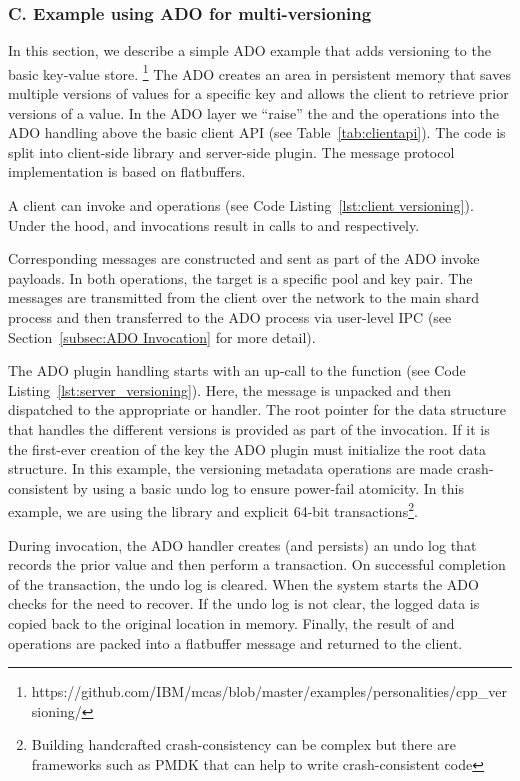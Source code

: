 \newpage
\subsubsection*{C. Example using ADO for multi-versioning}
\label{appendix:ado_versioning}
In this section, we describe a simple ADO example that adds versioning
to the basic key-value store.
\footnote{https://github.com/IBM/mcas/blob/master/examples/personalities/cpp\_versioning/}
The ADO creates an area in persistent memory that saves multiple
versions of values for a specific key and allows the client to
retrieve prior versions of a value.  In the ADO layer we ``raise''
the  and the  operations into the ADO handling
above the basic client API (see Table~\ref{tab:clientapi}). The code
is split into client-side library and server-side plugin. The message
protocol implementation is based on flatbuffers.

A client can invoke  and  operations (see Code
Listing~\ref{lst:client versioning}).  Under the hood, 
and  invocations result in calls to 
and  respectively.

Corresponding messages are
constructed and sent as part of the ADO invoke payloads.  In both operations, the target is a
specific pool and key pair.  The messages are transmitted from the
client over the network to the main shard process and then transferred to
the ADO process via user-level IPC (see
Section~\ref{subsec:ADO Invocation} for more detail).
  
The ADO plugin handling starts with an up-call to the 
 function (see Code Listing~\ref{lst:server_versioning}).  Here, the
 message is unpacked and then dispatched to the appropriate 
 or  handler.  The root pointer for the data structure that
 handles the different versions is provided as part of the  invocation.  If it is the first-ever creation of the key the
 ADO plugin must initialize the root data structure.  In this example,
 the versioning metadata operations are made crash-consistent by using
 a basic undo log to ensure power-fail atomicity. In this example, we
 are using the  library and explicit 64-bit
 transactions\footnote{Building handcrafted crash-consistency can be
 complex but there are frameworks such as PMDK that can help to write
 crash-consistent code}.

During  invocation, the ADO handler creates (and persists)
an undo log that records the prior value and then perform a
transaction.  On successful completion of the transaction, the undo
log is cleared.  When the system starts the ADO checks for the need to
recover.  If the undo log is not clear, the logged data is copied back
to the original location in memory.  Finally, the result of 
and  operations are packed into a flatbuffer message and
returned to the client.

